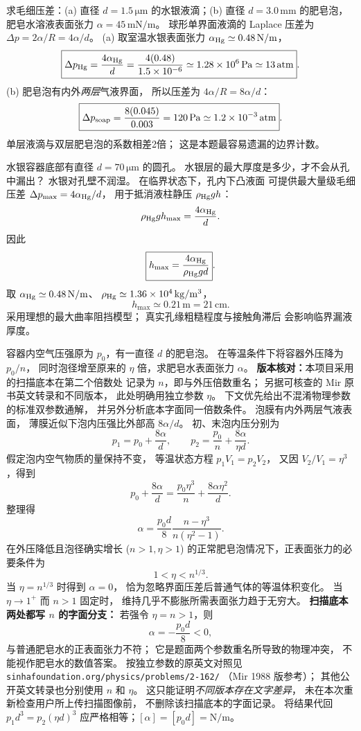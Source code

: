 求毛细压差：(a) 直径 $d=1.5\,\mathrm{\mu m}$
的水银液滴；(b) 直径 $d=3.0\,\mathrm{mm}$
的肥皂泡，肥皂水溶液表面张力
$\alpha=45\,\mathrm{mN/m}$。
\exsolution
球形单界面液滴的 Laplace 压差为
$\Delta p=2\alpha/R=4\alpha/d$。
(a) 取室温水银表面张力
$\alpha_{\rm Hg}\simeq0.48\,\mathrm{N/m}$，
\[
\boxed{\Delta p_{\rm Hg}=\frac{4\alpha_{\rm Hg}}d
=\frac{4(0.48)}{1.5\times10^{-6}}
\simeq1.28\times10^6\,\mathrm{Pa}
\simeq13\,\mathrm{atm}}.
\]
(b) 肥皂泡有内外\emph{两层}气液界面，
所以压差为 $4\alpha/R=8\alpha/d$：
\[
\boxed{\Delta p_{\rm soap}=\frac{8(0.045)}{0.003}
=120\,\mathrm{Pa}\simeq1.2\times10^{-3}\,\mathrm{atm}}.
\]
\excheck 单层液滴与双层肥皂泡的系数相差2倍；
这是本题最容易遗漏的边界计数。

水银容器底部有直径
$d=70\,\mathrm{\mu m}$ 的圆孔。
水银层的最大厚度是多少，才不会从孔中漏出？
\exsolution
水银对孔壁不润湿。
在临界状态下，孔内下凸液面
可提供最大量级毛细压差
$\Delta p_{\max}=4\alpha_{\rm Hg}/d$，
用于抵消液柱静压 $\rho_{\rm Hg}gh$：
\[
\rho_{\rm Hg}gh_{\max}=\frac{4\alpha_{\rm Hg}}d.
\]
因此
\[
\boxed{h_{\max}=\frac{4\alpha_{\rm Hg}}
{\rho_{\rm Hg}gd}}.
\]
取 $\alpha_{\rm Hg}\simeq0.48\,\mathrm{N/m}$、
$\rho_{\rm Hg}\simeq1.36\times10^4\,\mathrm{kg/m^3}$，
\[
\boxed{h_{\max}\simeq0.21\,\mathrm m=21\,\mathrm{cm}}.
\]
\excheck 采用理想的最大曲率阻挡模型；
真实孔缘粗糙程度与接触角滞后
会影响临界漏液厚度。

容器内空气压强原为 $p_0$，有一直径 $d$ 的肥皂泡。
在等温条件下将容器外压降为 $p_0/n$，
同时泡径增至原来的 $\eta$ 倍，求肥皂水表面张力 $\alpha$。
\textbf{版本核对：}本项目采用的扫描底本在第二个倍数处
记录为 $n$，即与外压倍数重名；
另据可核查的 Mir 原书英文转录和不同版本，
此处明确用独立参数 $\eta$。
下文优先给出不混淆物理参数的标准双参数通解，
并另外分析底本字面同一倍数条件。
\exsolution
泡膜有内外两层气液表面，
薄膜近似下泡内压强比外部高 $8\alpha/d$。
初、末泡内压分别为
\[
 p_1=p_0+\frac{8\alpha}{d},\qquad
 p_2=\frac{p_0}{n}+\frac{8\alpha}{\eta d}.
\]
假定泡内空气物质的量保持不变，
等温状态方程 $p_1V_1=p_2V_2$，
又因 $V_2/V_1=\eta^3$，得到
\[
 p_0+\frac{8\alpha}{d}
 =\frac{p_0\eta^3}{n}
   +\frac{8\alpha\eta^2}{d}.
\]
整理得
\[
 \boxed{\alpha=\frac{p_0d}{8}
       \frac{n-\eta^3}{n(\eta^2-1)}}.
\]
在外压降低且泡径确实增长 ($n>1,\eta>1$)
的正常肥皂泡情况下，正表面张力的必要条件为
\[
 \boxed{1<\eta<n^{1/3}}.
\]
当 $\eta=n^{1/3}$ 时得到 $\alpha=0$，
恰为忽略界面压差后普通气体的等温体积变化。
当 $\eta\to1^+$ 而 $n>1$ 固定时，
维持几乎不膨胀所需表面张力趋于无穷大。
\textbf{扫描底本两处都写 $n$ 的字面分支：}
若强令 $\eta=n>1$，则
\[
 \boxed{\alpha=-\frac{p_0d}{8}<0},
\]
与普通肥皂水的正表面张力不符；
它是题面两个参数重名所导致的物理冲突，
不能视作肥皂水的数值答案。
\excheck
按独立参数的原英文对照见
\texttt{sinhafoundation.org/physics/problems/2-162/}
（Mir 1988 版参考）；
其他公开英文转录也分别使用 $n$ 和 $\eta$。
这只能证明\emph{不同版本存在文字差异}，
未在本次重新检查用户所上传扫描图像前，
不删除该扫描底本的字面记录。
将结果代回 $p_1d^3=p_2(\eta d)^3$
应严格相等；$[\alpha]=[p_0d]=\mathrm{N/m}$。

